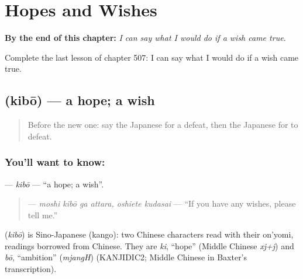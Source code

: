 
\chapter{Hopes and Wishes}
\label{ch:ja-hopes-and-wishes}

\begin{chapteropening}
\textbf{By the end of this chapter:} \emph{I can say what I would do if a wish came true.}

Complete the last lesson of chapter 507: I can say what I would do if a wish came true.
\end{chapteropening}

\section[\texorpdfstring{\ja{きぼう} (kibō)}{きぼう (kibō)}]{ (kibō) — a hope; a wish}

\label{lesson:JA-C507-kibou}



\begin{quote}
Before the new one: say the Japanese for a defeat, then the Japanese for to defeat.
\end{quote}

\subsection*{You'll want to know: }
\textbf{} — \emph{kibō} — \textquotedblleft{}a hope; a wish\textquotedblright{}.

\begin{quote}
\textbf{   } — \emph{moshi kibō ga attara, oshiete kudasai} — \textquotedblleft{}If you have any wishes, please tell me.\textquotedblright{}
\end{quote}

\begin{cousinweb}
\textbf{} (\emph{kibō}) is Sino-Japanese (kango): two Chinese characters read with their on'yomi, readings borrowed from Chinese. They are \emph{ki}, \textquotedblleft{}hope\textquotedblright{} (Middle Chinese \emph{xj+j}) and \emph{bō}, \textquotedblleft{}ambition\textquotedblright{} (\emph{mjangH}) (KANJIDIC2; Middle Chinese in Baxter's transcription).
\end{cousinweb}

